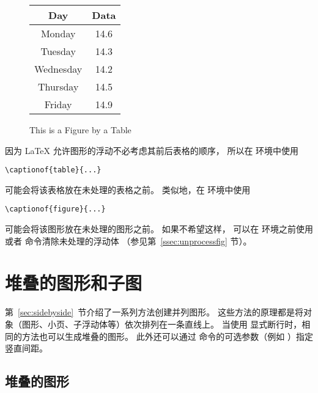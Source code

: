 \begin{figure}[htb]
	\begin{minipage}[b]{0.5\linewidth}
		\centering
		\resizebox{0.8\linewidth}{!}{\usebox{\boxgraphic}}
		\caption{This is a Figure by a Table}
		\label{fig:by:table}
	\end{minipage}%
	\begin{minipage}[b]{0.5\linewidth}
		\centering
		\begin{tabular}{|c|c|} \hline
			Day & Data \\ \hline\hline
			Monday & 14.6 \\
			Tuesday & 14.3 \\
			Wednesday & 14.2 \\
			Thursday & 14.5 \\
			Friday & 14.9 \\ \hline
		\end{tabular}
		\label{tab:by:fig}
	\end{minipage}
\end{figure}

因为 \LaTeX{} 允许图形的浮动不必考虑其前后表格的顺序，
所以在  环境中使用
\begin{lstlisting}
\captionof{table}{...}
\end{lstlisting}
可能会将该表格放在未处理的表格之前。
类似地，在  环境中使用
\begin{lstlisting}
\captionof{figure}{...}
\end{lstlisting}
可能会将该图形放在未处理的图形之前。
如果不希望这样，
可以在  环境之前使用  或者  命令清除未处理的浮动体
（参见第~\ref{ssec:unprocessfig} 节）。


\section{堆叠的图形和子图}\label{sec:stackfigs}

第~\ref{sec:sidebyside}~节介绍了一系列方法创建并列图形。
这些方法的原理都是将对象（图形、小页、子浮动体等）依次排列在一条直线上。
当使用 \cmd{\cmd{}} 显式断行时，相同的方法也可以生成堆叠的图形。
此外还可以通过 \cmd{\cmd{}} 命令的可选参数（例如 \cmd{\cmd{}}\opt{[20pt]}）指定竖直间距。

\subsection{堆叠的图形}\label{ssec:stackfigs}

